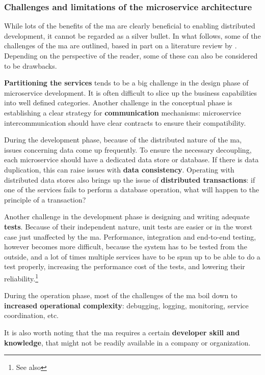 \subsubsection{Challenges and limitations of the microservice architecture}

While lots of the benefits of the \gls{ma} are clearly beneficial to enabling
distributed development, it cannot be regarded as a silver bullet. In what
follows, some of the challenges of the \gls{ma} are outlined, based in part on a
literature review by \textcite{Soldani_2018}.
Depending on the perspective of the reader, some of these can also be considered
to be drawbacks.

\textbf{Partitioning the services} tends to be a big challenge in the design
phase of \gls{microservice} development. It is often difficult to slice up the
business capabilities into well defined categories. Another challenge in the
conceptual phase is establishing a clear strategy for \textbf{communication}
mechanisms: \gls{microservice} intercommunication should have clear contracts to
ensure their compatibility.

During the development phase, because of the distributed nature of the \gls{ma},
issues concerning data come up frequently. To ensure the necessary decoupling,
each microservice should have a dedicated data store or database. If there is
data duplication, this can raise issues with \textbf{data consistency}.
Operating with distributed data stores also brings up the issue of
\textbf{distributed transactions}: if one of the services fails to perform a
database operation, what will happen to the principle of a transaction?

Another challenge in the development phase is designing and writing adequate
\textbf{tests}. Because of their independent nature, unit tests are easier or in
the worst case just unaffected by the \gls{ma}. Performance, integration and
end-to-end testing, however becomes more difficult, because the system has to be
tested from the outside, and a lot of times multiple services have to be spun up
to be able to do a test properly, increasing the performance cost of the tests,
and lowering their reliability.\footnote{See also
}

During the operation phase, most of the challenges of the \gls{ma} boil down to
\textbf{increased operational complexity}: debugging, logging,  monitoring,
service coordination, etc. 

It is also worth noting that the \gls{ma} requires a certain \textbf{developer
skill and knowledge}, that might not be readily available in a company or
organization.
